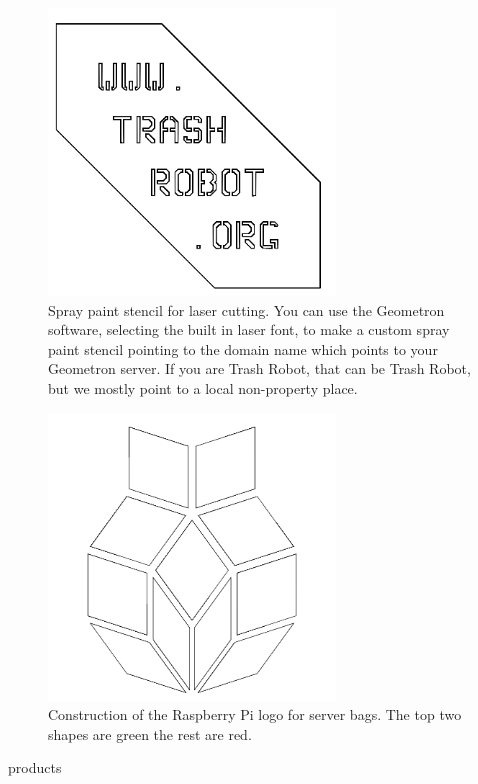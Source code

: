 \begin{figure}
	\centering
	\includegraphics[width=3in]{figures/actiongeometry/stencil.png}
	\caption[stencil]
	{Spray paint stencil for laser cutting. You can use the Geometron software, selecting the built in laser font, to make a custom spray paint stencil pointing to the domain name which points to your Geometron server.  If you are Trash Robot, that can be Trash Robot, but we mostly point to a local non-property place.}
\end{figure}


\begin{figure}
	\centering
	\includegraphics[width=3in]{figures/actiongeometry/pilogo.png}
	\caption[pilogo]
	{Construction of the Raspberry Pi logo for server bags. The top two shapes are green the rest are red.}
\end{figure}


products


